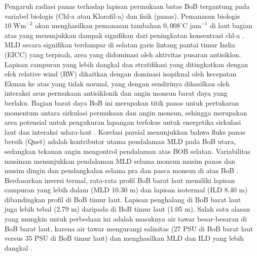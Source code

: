 \begin{spacing}{1.5}
	Pengaruh radiasi panas terhadap lapisan permukaan batas BoB tergantung pada variabel biologis (Chl-a atau Klorofil-a) dan fisik (panas). Pemanasan biologis $10\; \text{Wm}^{-2}$ akan menghasilkan pemanasan tambahan $0,008^\circ \text{C jam}^{-1}$ di laut bagian atas yang menunjukkan dampak signifikan dari peningkatan konsentrasi chl-a . MLD secara signifikan terdampar di selatan garis lintang pantai timur India (EICC) yang terpisah, area yang didominasi oleh aktivitas pusaran antisiklon. Lapisan campuran yang lebih dangkal dan stratifikasi yang ditingkatkan dengan efek relative wind (RW) dikaitkan dengan dominasi isopiknal oleh kecepatan Ekman ke atas yang tidak normal, yang dengan sendirinya dihasilkan oleh interaksi arus permukaan antisiklonik dan angin monsun barat daya yang berlaku. Bagian barat daya BoB ini merupakan titik panas untuk pertukaran momentum antara sirkulasi permukaan dan angin monsun, sehingga merupakan area potensial untuk pengukuran lapangan terfokus untuk energetika sirkulasi laut dan interaksi udara-laut . Korelasi parsial menunjukkan bahwa fluks panas bersih (Qnet) adalah kontributor utama pendalaman MLD pada BoB utara, sedangkan tekanan angin mengontrol pendalaman atas BOB selatan. Variabilitas musiman menunjukkan pendalaman MLD selama monsun musim panas dan musim dingin dan pendangkalan selama pra dan pasca monsun di atas BoB . Berdasarkan inversi termal, rata-rata profil BoB barat laut memiliki lapisan campuran yang lebih dalam (MLD 10.30 m) dan lapisan isotermal (ILD 8.40 m) dibandingkan profil di BoB timur laut. Lapisan penghalang di BoB barat laut juga lebih tebal (2.79 m) daripada di BoB timur laut (1.05 m). Salah satu alasan yang mungkin untuk perbedaan ini adalah masuknya air tawar besar-besaran di BoB barat laut, karena air tawar mengurangi salinitas (27 PSU di BoB barat laut versus 35 PSU di BoB timur laut) dan menghasilkan MLD dan ILD yang lebih dangkal .
	

\end{spacing}
